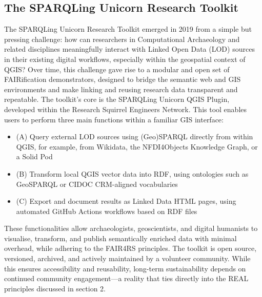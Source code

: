 \documentclass{eceasst}
\begin{document}
\subsection{The SPARQLing Unicorn Research Toolkit}\label{sec:32}

The SPARQLing Unicorn Research Toolkit emerged in 2019 from a simple but pressing challenge: how can researchers in Computational Archaeology and related disciplines meaningfully interact with Linked Open Data (LOD) sources in their existing digital workflows, especially within the geospatial context of QGIS? Over time, this challenge gave rise to a modular and open set of FAIRification demonstrators, designed to bridge the semantic web and GIS environments and make linking and reusing research data transparent and repeatable. The toolkit's core is the SPARQLing Unicorn QGIS Plugin, developed within the Research Squirrel Engineers Network. This tool enables users to perform three main functions within a familiar GIS interface:

\begin{itemize}
    \item (A) Query external LOD sources using (Geo)SPARQL directly from within QGIS, for example, from Wikidata, the NFDI4Objects Knowledge Graph, or a Solid Pod
    \item (B) Transform local QGIS vector data into RDF, using ontologies such as GeoSPARQL or CIDOC CRM-aligned vocabularies
    \item (C) Export and document results as Linked Data HTML pages, using automated GitHub Actions workflows based on RDF files
\end{itemize}

These functionalities allow archaeologists, geoscientists, and digital humanists to visualise, transform, and publish semantically enriched data with minimal overhead, while adhering to the FAIR4RS principles. The toolkit is open source, versioned, archived, and actively maintained by a volunteer community. While this ensures accessibility and reusability, long-term sustainability depends on continued community engagement—a reality that ties directly into the REAL principles discussed in section 2.
\end{document}
